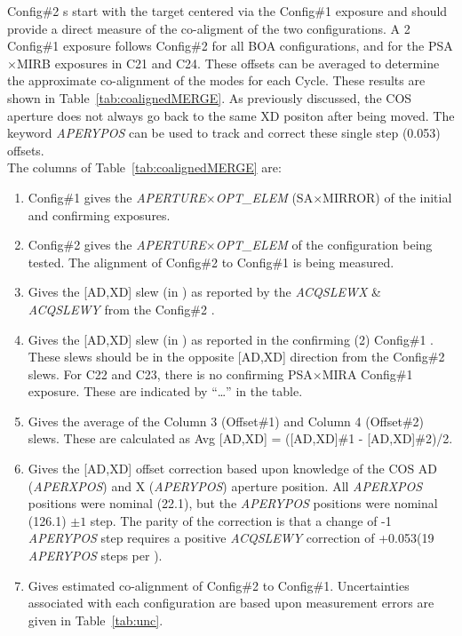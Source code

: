 Config\#2 s start with the target centered via the Config\#1 exposure and
should provide a direct measure of the co-aligment of the two configurations.
A 2 Config\#1 exposure follows Config\#2 for all BOA configurations, and for the PSA$\times$MIRB exposures in C21 and C24.
These offsets can be averaged to determine the approximate co-alignment of the modes for each Cycle.
These results are shown in Table~\ref{tab:coalignedMERGE}. As previously discussed, the COS aperture does not always go back to
the same XD positon after being moved. The keyword \textit{APERYPOS} can be used to track and correct these single step (0.053\arcsec) offsets.\\

The columns of Table~\ref{tab:coalignedMERGE} are:
\footnotesize
\begin{enumerate}
\item Config\#1 gives the \textit{APERTURE}$\times$\textit{OPT\_ELEM} (SA$\times$MIRROR) of the initial and confirming  exposures.
\item Config\#2 gives the \textit{APERTURE}$\times$\textit{OPT\_ELEM} of the  configuration being tested. The alignment of Config\#2 to
Config\#1 is being measured.
\item Gives the [AD,XD] slew (in \arcsec) as reported by the \textit{ACQSLEWX} \& \textit{ACQSLEWY} from the Config\#2 .
\item Gives the [AD,XD] slew (in \arcsec) as reported in the confirming (2) Config\#1 . These slews should be in the opposite [AD,XD]
direction from the Config\#2 slews. For C22 and C23, there is no confirming PSA$\times$MIRA Config\#1 exposure. These are indicated by ``\dots'' in the table.
\item Gives the average of the Column 3 (Offset\#1) and Column 4 (Offset\#2) slews. These are calculated as Avg [AD,XD] = ([AD,XD]\#1 - [AD,XD]\#2)/2.
\item Gives the [AD,XD] offset correction based upon knowledge of the COS AD (\textit{APERXPOS}) and X (\textit{APERYPOS}) aperture position.
All \textit{APERXPOS} positions were nominal (22.1), but the \textit{APERYPOS} positions were nominal (126.1) $\pm 1$ step. The parity of the correction is that a change of -1 \textit{APERYPOS} step requires a positive
\textit{ACQSLEWY} correction of +0.053\arcsec{}(19 \textit{APERYPOS} steps per \arcsec).
\item Gives estimated co-alignment of Config\#2 to Config\#1. Uncertainties associated with each  configuration are based upon measurement errors are given in Table~\ref{tab:unc}.
\end{enumerate}
\normalsize

